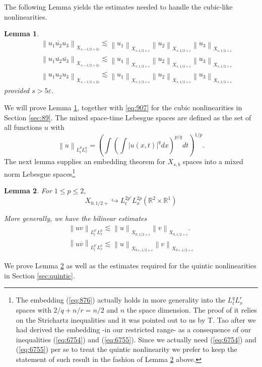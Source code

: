 \documentclass[draft,11pt,leqno]{amsart}
\newtheorem{lemma}{Lemma}
\newcommand{\norm}[2]{{\left\| #1 \right\|}_{#2}}
\newcommand{\ve}{\varepsilon}
\newcommand{\rone}{\mathbb R^1}
\newcommand{\rtwo}{\mathbb R^2}
\newcommand{\hra}{\hookrightarrow}
\begin{document}
The following 
Lemma yields the estimates needed to handle the cubic-like 
nonlinearities.
\begin{lemma}
\label{le:956}
\begin{eqnarray}
\label{eq:371}
& &\norm{u_1\overline{u_2}u_3}{X_{s,-1/2+2\ve}}
\lesssim \norm{u_1}{X_{s,1/2+\ve}}
\norm{u_2}{X_{s,1/2+\ve}}\norm{u_3}{X_{s,1/2+\ve}} \\
& &\norm{u_1\overline{u_2} \overline{u_3}}{X_{s,-1/2+2\ve}}
\lesssim \norm{u_1}{X_{s,1/2+\ve}}
\norm{u_2}{X_{s,1/2+\ve}}\norm{u_3}{X_{s,1/2+\ve}}
\label{eq:372} \\
& & \norm{u_1 u_2 u_3}{X_{s,-1/2+2\ve}}
\lesssim \norm{u_1}{X_{s,1/2+\ve}}
\norm{u_2}{X_{s,1/2+\ve}}\norm{u_3}{X_{s,1/2+\ve}}
\label{eq:377}
\end{eqnarray}
provided $s>5\ve$.
\end{lemma}
We will prove Lemma \ref{le:956}, together with \eqref{eq:907}
for the cubic nonlinearities in Section \ref{sec:89}. The mixed space-time 
 Lebesgue
spaces are defined as the set of all functions $u$ with
$$
\norm{u}{L_t^pL_x^q}=\left(\int\left(\int |u(x,t)|^q dx\right)^{p/q}dt\right)^{1/p}.
$$
The next lemma supplies an embedding theorem for $X_{s,b}$ spaces 
into a mixed norm  Lebesgue spaces\footnote{The embedding (\ref{eq:876})
   actually holds in more generality into the $L^q_t L^r_x$ spaces
  with $2/q + n/r =n/2$ and $n$ the space dimension. The proof of it 
relies on the Strichartz inequalities and it was pointed out  
to us by T. Tao after we had derived the embedding -in our
  restricted range- as a consequence of our inequalities (\ref{eq:6754}) 
and (\ref{eq:6755}). Since we actually need  (\ref{eq:6754}) 
and (\ref{eq:6755}) per se to treat the quintic nonlinearity we prefer to keep 
the statement of such result in the fashion of Lemma \ref{le:456} above.} 
\begin{lemma}
\label{le:456}
For $1\leq p\leq 2$, 
\begin{equation}
\label{eq:876}
X_{0,1/2+}\hra L_t^{2p'}L_x^{2p}(\rtwo\times \rone)
\end{equation}

More generally, we have the bilinear estimates
\begin{eqnarray}
\label{eq:6754}
\norm{u v}{L_t^{p'}L_x^{p}}\lesssim 
\norm{u}{X_{0,1/2+\ve}}\norm{v}{X_{0,1/2+\ve}}.\\
\label{eq:6755}
\norm{u \overline{v}}{L_t^{p'}L_x^{p}}\lesssim 
\norm{u}{X_{0+,1/2+\ve}}\norm{v}{X_{0+,1/2+\ve}}
\end{eqnarray}
\end{lemma}
We prove Lemma \ref{le:456} as well as the estimates required
for the quintic nonlinearities in Section \ref{sec:quintic}.
\end{document}
